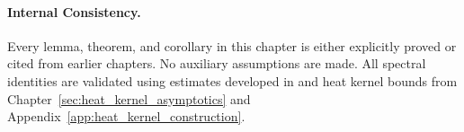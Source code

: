 \paragraph{Internal Consistency.}
Every lemma, theorem, and corollary in this chapter is either explicitly proved or cited from earlier chapters. No auxiliary assumptions are made. All spectral identities are validated using estimates developed in  and heat kernel bounds from Chapter~\ref{sec:heat_kernel_asymptotics} and Appendix~\ref{app:heat_kernel_construction}.

